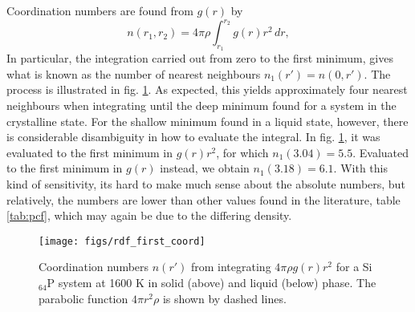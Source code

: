 \documentclass[11pt,bibliography=totoc,index=totoc]{scrbook}   %
\begin{document}
Coordination numbers are found from $g(r)$ by
\begin{equation}
    n(r_1,r_2) = 4\pi\rho \int_{r_1}^{r_2} g(r) r^2 \,dr,
    \label{eq:coordno}
\end{equation}
In particular, the integration carried out from zero to the first minimum, 
gives what is known as the number of nearest neighbours $n_1(r') = n(0,r')$.\cite[7]{Waseda:1980}
The process is illustrated in fig. \ref{fig:rdffirstcoord}.
As expected, this yields approximately four nearest neighbours when integrating until the deep minimum found for a system in the crystalline state.
For the shallow minimum found in a liquid state, however, there is considerable disambiguity in how to evaluate the integral.
In fig. \ref{fig:rdffirstcoord}, it was evaluated to 
the first minimum in $g(r)r^2$, for which $n_1(3.04)=5.5$.
Evaluated to the first minimum in $g(r)$ instead, we obtain $n_1(3.18) = 6.1$. 
With this kind of sensitivity, its hard to make much sense about the absolute numbers,
but relatively, the numbers are lower than other values found in the literature, 
table \ref{tab:pcf}, which may again be due to the differing density.


\begin{figure}[htbp]
  \centering
  \texttt{[image: figs/rdf\_first\_coord]}
  \caption{Coordination numbers $n(r')$ from integrating $4\pi\rho g(r) r^2 $ for a Si$_64$P system
      at 1600 K in solid (above) and liquid (below) phase.
     The parabolic function $4\pi r^2 \rho$ is shown by dashed lines.
    }
  \label{fig:rdffirstcoord}
\end{figure}
\end{document}
